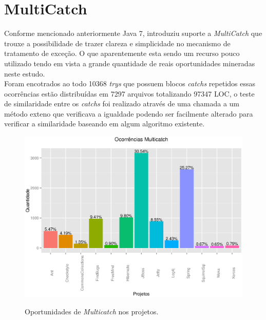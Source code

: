 \section{MultiCatch}
Conforme mencionado anteriormente Java 7, introduziu suporte a \textit{MultiCatch} que trouxe a possibilidade de trazer clareza e simplicidade no mecanismo de tratamento de exceção. O que aparentemente esta sendo um recurso pouco utilizado tendo em vista a grande quantidade de reais  oportunidades mineradas neste estudo.\\

Foram encotrados ao todo 10368 \textit{trys} que possuem blocos \textit{catchs} repetidos essas ocorrências estão distribuídas em 7297 arquivos totalizando 97347 \acs{LOC}, o teste de  similaridade entre os \textit{catchs} foi realizado através de uma chamada a um método exteno que verificava a igualdade podendo ser facilmente alterado para verificar a similaridade baseando em algum algoritmo existente.\\


\begin{figure}[h]
	\center
	\includegraphics[scale=0.8]{Imagens/ocorrenciasMulticatch}
	\label{fig:Muticatch}
	\caption{Oportunidades de \textit{Multicatch} nos projetos.}
\end{figure}
		

